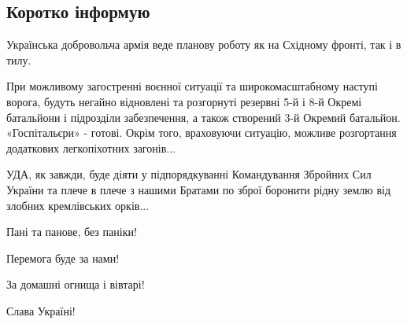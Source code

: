  
 
 
 
 
\subsection{Коротко інформую}

Українська добровольча армія веде планову роботу як на Східному фронті, так і в тилу.

При можливому загостренні воєнної ситуації та широкомасштабному наступі ворога,
будуть негайно відновлені та розгорнуті резервні 5-й і 8-й Окремі батальйони і
підрозділи забезпечення, а також створений 3-й Окремий батальйон.
«Госпітальєри» - готові. Окрім того, враховуючи ситуацію, можливе розгортання
додаткових легкопіхотних загонів... 

УДА, як завжди, буде діяти у підпорядкуванні Командування Збройних Сил України
та плече в плече з нашими Братами по зброї боронити рідну землю від злобних
кремлівських орків...

Пані та панове, без паніки! 

Перемога буде за нами!

За домашні огнища і вівтарі!

Слава Україні!
